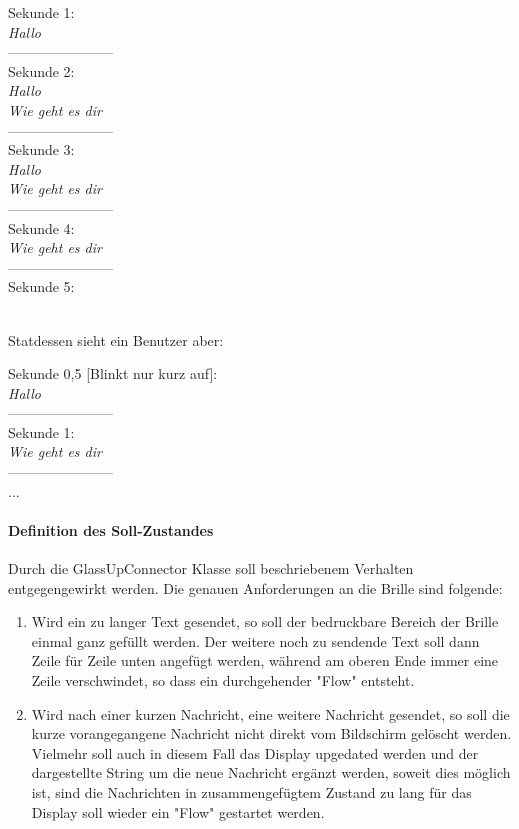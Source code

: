 \begin{enumerate}
\begin{addmargin}[1cm]{0cm}
	 Sekunde 1:\\
	\textit{Hallo} \\
	-----------------------\\
	Sekunde 2:\\
	\textit{Hallo \\
	Wie geht es dir \\}
	-----------------------\\
	Sekunde 3:\\
	\textit{Hallo \\
	Wie geht es dir \\}
	-----------------------\\
	Sekunde 4:\\
	\textit{Wie geht es dir \\}
	-----------------------\\
	Sekunde 5:\\
	\textit{\\}
\end{addmargin}

Statdessen sieht ein Benutzer aber:
\begin{addmargin}[1cm]{0cm}
 Sekunde 0,5 [Blinkt nur kurz auf]:\\
\textit{Hallo} \\
-----------------------\\
Sekunde 1:\\
\textit{Wie geht es dir \\}
-----------------------\\
...
\end{addmargin}

\end{enumerate}

\paragraph{Definition des Soll-Zustandes}
Durch die GlassUpConnector Klasse soll beschriebenem Verhalten entgegengewirkt werden. Die genauen Anforderungen an die Brille sind folgende:
\begin{enumerate}
	\item Wird ein zu langer Text gesendet, so soll der bedruckbare Bereich der Brille einmal ganz gefüllt werden. Der weitere noch zu sendende Text soll dann Zeile für Zeile unten angefügt werden, während am oberen Ende immer eine Zeile verschwindet, so dass ein durchgehender "Flow" entsteht.
	\item Wird nach einer kurzen Nachricht, eine weitere Nachricht gesendet, so soll die kurze vorangegangene Nachricht nicht direkt vom Bildschirm gelöscht werden. Vielmehr soll auch in diesem Fall das Display upgedated werden und der dargestellte String um die neue Nachricht ergänzt werden, soweit dies möglich ist, sind die Nachrichten in zusammengefügtem Zustand zu lang für das Display soll wieder ein "Flow" gestartet werden.
\end{enumerate}
